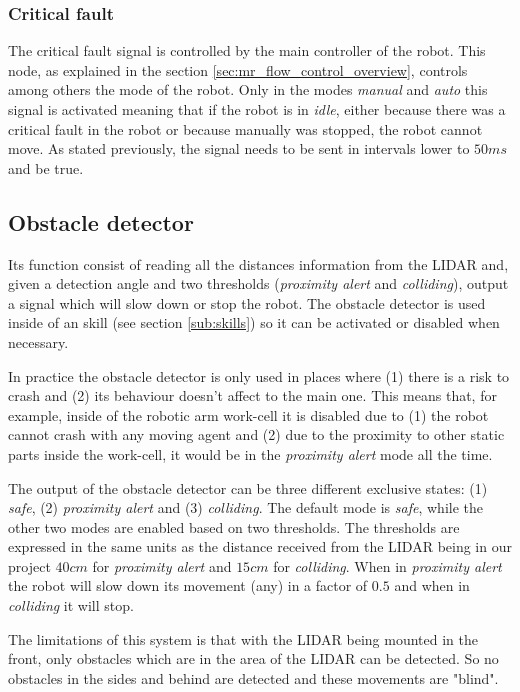 		\subsubsection{Critical fault} %
		\label{ssub:mr_critical_fault}
		The critical fault signal is controlled by the main controller of the robot.
		This node, as explained in the section \ref{sec:mr_flow_control_overview}, controls among others the mode of the robot.
		Only in the modes \emph{manual} and \emph{auto} this signal is activated meaning that if the robot is in \emph{idle}, either because there was a critical fault in the robot or because manually was stopped, the robot cannot move.
		As stated previously, the signal needs to be sent in intervals lower to $50ms$ and be true.

	\subsection{Obstacle detector} %
	\label{sub:mr_obstacle_detector}
	Its function consist of reading all the distances information from the LIDAR and, given a detection angle and two thresholds (\emph{proximity alert} and \emph{colliding}), output a signal which will slow down or stop the robot.
	The obstacle detector is used inside of an skill (see section \ref{sub:skills}) so it can be activated or disabled when necessary.

	In practice the obstacle detector is only used in places where (1) there is a risk to crash and (2) its behaviour doesn't affect to the main one.
	This means that, for example, inside of the robotic arm work-cell it is disabled due to (1) the robot cannot crash with any moving agent and (2) due to the proximity to other static parts inside the work-cell, it would be in the \emph{proximity alert} mode all the time. 


	The output of the obstacle detector can be three different exclusive states: (1) \emph{safe}, (2) \emph{proximity alert} and (3) \emph{colliding}. 
	The default mode is \emph{safe}, while the other two modes are enabled based on two thresholds.
	The thresholds are expressed in the same units as the distance received from the LIDAR being in our project $40cm$ for \emph{proximity alert} and $15cm$ for \emph{colliding}.
	When in \emph{proximity alert} the robot will slow down its movement (any) in a factor of $0.5$ and when in \emph{colliding} it will stop.

	The limitations of this system is that with the LIDAR being mounted in the front, only obstacles which are in the area of the LIDAR can be detected.
	So no obstacles in the sides and behind are detected and these movements are "blind".
